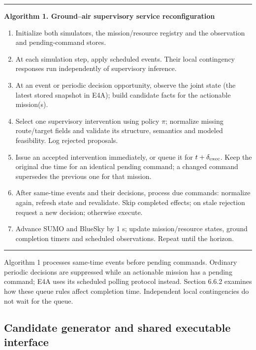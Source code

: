 \documentclass[]{interact}
\theoremstyle{plain}
\theoremstyle{definition}
\theoremstyle{remark}
\begin{document}
\begin{center}
\begin{minipage}{0.96\textwidth}
\hrule\vspace{5pt}
\textbf{Algorithm 1. Ground--air supervisory service reconfiguration}
\begin{enumerate}\setlength{\itemsep}{1pt}\setlength{\parskip}{0pt}
\item Initialize both simulators, the mission/resource registry and the observation and pending-command stores.
\item At each simulation step, apply scheduled events. Their local contingency responses run independently of supervisory inference.
\item At an event or periodic decision opportunity, observe the joint state (the latest stored snapshot in E4A); build candidate facts for the actionable mission(s).
\item Select one supervisory intervention using policy $\pi$; normalize missing route/target fields and validate its structure, semantics and modeled feasibility. Log rejected proposals.
\item Issue an accepted intervention immediately, or queue it for $t+\delta_{\rm exec}$. Keep the original due time for an identical pending command; a changed command supersedes the previous one for that mission.
\item After same-time events and their decisions, process due commands: normalize again, refresh state and revalidate. Skip completed effects; on stale rejection request a new decision; otherwise execute.
\item Advance SUMO and BlueSky by 1 s; update mission/resource states, ground completion timers and scheduled observations. Repeat until the horizon.
\end{enumerate}
\vspace{3pt}\hrule
\end{minipage}
\end{center}

Algorithm 1 processes same-time events before pending commands. Ordinary periodic decisions are suppressed while an actionable mission has a pending command; E4A uses its scheduled polling protocol instead. Section 6.6.2 examines how these queue rules affect completion time. Independent local contingencies do not wait for the queue.

\subsection{Candidate generator and shared executable interface}
\end{document}
